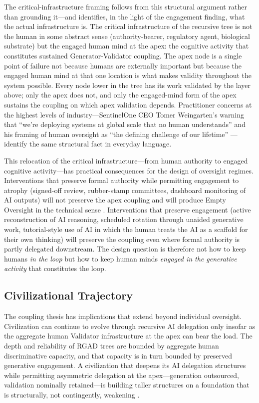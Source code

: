 \documentclass[11pt,a4paper]{article}
\begin{document}
The critical-infrastructure framing follows from this structural argument rather than grounding it---and identifies, in the light of the engagement finding, what the actual infrastructure is. The critical infrastructure of the recursive tree is not the human in some abstract sense (authority-bearer, regulatory agent, biological substrate) but the engaged human mind at the apex: the cognitive activity that constitutes sustained Generator-Validator coupling. The apex node is a single point of failure not because humans are externally important but because the engaged human mind at that one location is what makes validity throughout the system possible. Every node lower in the tree has its work validated by the layer above; only the apex does not, and only the engaged-mind form of the apex sustains the coupling on which apex validation depends. Practitioner concerns at the highest levels of industry---SentinelOne CEO Tomer Weingarten's warning that ``we're deploying systems at global scale that no human understands'' and his framing of human oversight as ``the defining challenge of our lifetime'' \citep{hof2026}---identify the same structural fact in everyday language.

This relocation of the critical infrastructure---from human authority to engaged cognitive activity---has practical consequences for the design of oversight regimes. Interventions that preserve formal authority while permitting engagement to atrophy (signed-off review, rubber-stamp committees, dashboard monitoring of AI outputs) will not preserve the apex coupling and will produce Empty Oversight in the technical sense \citep{lin2026}. Interventions that preserve engagement (active reconstruction of AI reasoning, scheduled rotation through unaided generative work, tutorial-style use of AI in which the human treats the AI as a scaffold for their own thinking) will preserve the coupling even where formal authority is partly delegated downstream. The design question is therefore not how to keep humans \emph{in the loop} but how to keep human minds \emph{engaged in the generative activity} that constitutes the loop.

\subsection{Civilizational Trajectory}
The coupling thesis has implications that extend beyond individual oversight. Civilization can continue to evolve through recursive AI delegation only insofar as the aggregate human Validator infrastructure at the apex can bear the load. The depth and reliability of RGAD trees are bounded by aggregate human discriminative capacity, and that capacity is in turn bounded by preserved generative engagement. A civilization that deepens its AI delegation structures while permitting asymmetric delegation at the apex---generation outsourced, validation nominally retained---is building taller structures on a foundation that is structurally, not contingently, weakening \citep{kulveit2025}.
\end{document}
